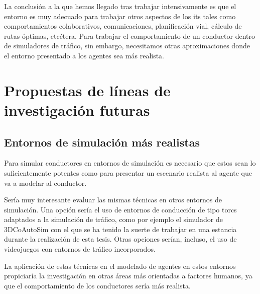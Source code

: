 La conclusión a la que hemos llegado tras trabajar intensivamente es que el entorno es muy adecuado para trabajar otros aspectos de los \acrshort{its} tales como comportamientos colaborativos, comunicaciones, planificación vial, cálculo de rutas óptimas, etcétera. Para trabajar el comportamiento de un conductor dentro de simuladores de tráfico, sin embargo, necesitamos otras aproximaciones donde el entorno presentado a los agentes sea más realista.

\section{Propuestas de líneas de investigación futuras}

\subsection{Entornos de simulación más realistas}

Para simular conductores en entornos de simulación es necesario que estos sean lo suficientemente potentes como para presentar un escenario realista al agente que va a modelar al conductor.

Sería muy interesante evaluar las mismas técnicas en otros entornos de simulación. Una opción sería el uso de entornos de conducción de tipo \ac{torcs} adaptados a la simulación de tráfico, como por ejemplo el simulador de 3DCoAutoSim \cite{olaverri2018implementation} con el que se ha tenido la suerte de trabajar en una estancia durante la realización de esta tesis. Otras opciones serían, incluso, el uso de videojuegos con entornos de tráfico incorporados.

La aplicación de estas técnicas en el modelado de agentes en estos entornos propiciaría la investigación en otras áreas más orientadas a factores humanos, ya que el comportamiento de los conductores sería más realista.

